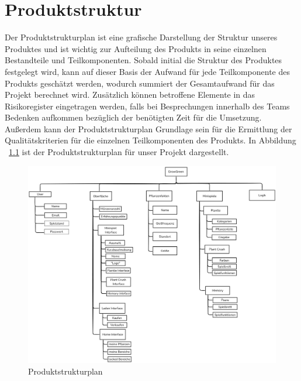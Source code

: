 \chapter{Produktstruktur}\label{ch:produktstruktur}
Der Produktstrukturplan ist eine grafische Darstellung der Struktur unseres Produktes und ist wichtig
zur Aufteilung des Produkts in seine einzelnen Bestandteile und Teilkomponenten.
Sobald initial die Struktur des Produktes festgelegt wird, kann auf dieser Basis der Aufwand für jede Teilkomponente des
Produkts geschätzt werden, wodurch summiert der Gesamtaufwand für das Projekt berechnet wird. 
Zusätzlich können betroffene Elemente in das Risikoregister eingetragen werden, falls bei Besprechungen innerhalb des 
Teams Bedenken aufkommen bezüglich der benötigten Zeit für die Umsetzung.
Außerdem kann der Produktstrukturplan Grundlage sein für die Ermittlung der Qualitätskriterien für die einzelnen 
Teilkomponenten des Produkts. 
In Abbildung ~\ref{fig:produktstrukturplan} ist der Produktstrukturplan für unser Projekt dargestellt.
\vspace{2cm}
\begin{figure}[h]
    \centering
    \includegraphics[width=\linewidth]{bilder/Produktstrukturplan.png}
    \caption{Produktstrukturplan}
    \label{fig:produktstrukturplan}
\end{figure}